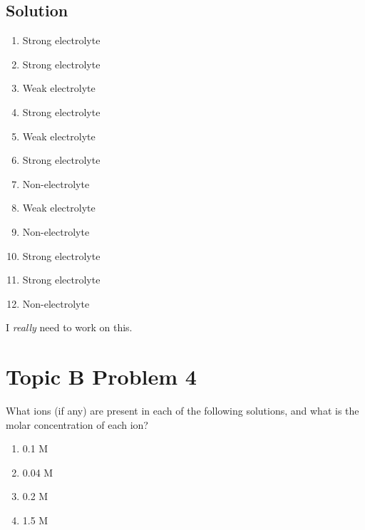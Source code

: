 \documentclass[10pt]{article}
\begin{document}
        \subsection{Solution}
            \begin{multicols}{3}
                \begin{enumerate}[label=\alph*)]
                    \item   Strong electrolyte
                    \item   Strong electrolyte
                    \item   Weak electrolyte
                    \item   Strong electrolyte
                    \item   Weak electrolyte
                    \item   Strong electrolyte
                    \item   Non-electrolyte
                    \item   Weak electrolyte
                    \item   Non-electrolyte
                    \item   Strong electrolyte
                    \item   Strong electrolyte
                    \item   Non-electrolyte
                \end{enumerate}
            \end{multicols}

            I \textit{really} need to work on this.

    \pagebreak
    \section{Topic B Problem 4}
        What ions (if any) are present in each of the following solutions, and what is the molar concentration of each ion?
        
        \begin{multicols}{2}
            \begin{enumerate}[label=\alph*)]
                \item   0.1 M 
                \item   0.04 M 
                \item   0.2 M 
                \item   1.5 M 
            \end{enumerate}
        \end{multicols}
\end{document}
